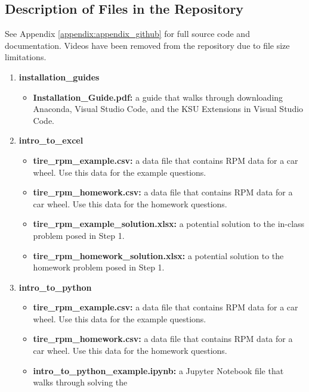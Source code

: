 \subsection{Description of Files in the Repository}
See Appendix \ref{appendix:appendix_github} for full source code
and documentation. Videos have been removed from the repository
due to file size limitations.
\begin{enumerate}
    \item \textbf{installation\_guides}
        \begin{itemize}
            \item \textbf{Installation\_Guide.pdf:} a guide 
            that walks through downloading Anaconda, Visual 
            Studio Code, and the KSU Extensions in Visual 
            Studio Code.
        \end{itemize}
    \item \textbf{intro\_to\_excel}
        \begin{itemize}
            \item \textbf{tire\_rpm\_example.csv:} a data file 
            that contains RPM data for a car wheel. Use this 
            data for the example questions.
            \item \textbf{tire\_rpm\_homework.csv:} a data file 
            that contains RPM data for a car wheel. Use this 
            data for the homework questions.
            \item \textbf{tire\_rpm\_example\_solution.xlsx:} a 
            potential solution to the in-class problem posed in 
            Step 1.
            \item \textbf{tire\_rpm\_homework\_solution.xlsx:} a 
            potential solution to the homework problem posed in 
            Step 1.
        \end{itemize}
    \item \textbf{intro\_to\_python}
        \begin{itemize}
            \item \textbf{tire\_rpm\_example.csv:} a data file 
            that contains RPM data for a car wheel. Use this 
            data for the example questions.
            \item \textbf{tire\_rpm\_homework.csv:} a data file 
            that contains RPM data for a car wheel. Use this 
            data for the homework questions.
            \item \textbf{intro\_to\_python\_example.ipynb:} a 
            Jupyter Notebook file that walks through solving the 

\end{itemize}
\end{enumerate}

